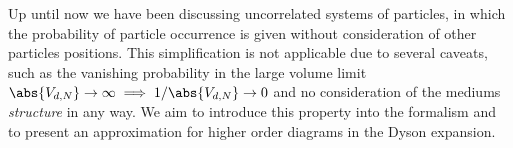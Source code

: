 Up until now we have been discussing uncorrelated systems of particles, in which the probability of particle occurrence is given without consideration of other particles positions. This simplification is not applicable due to several caveats, such as the vanishing probability in the large volume limit $\abs{V_{d,N}}\to\infty\implies 1/\abs{V_{d,N}}\to 0$ and no consideration of the mediums \emph{structure} in any way. We aim to introduce this property into the formalism and to present an approximation for higher order diagrams in the Dyson expansion.